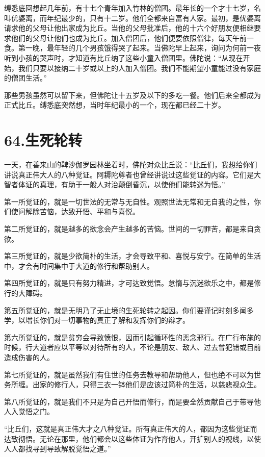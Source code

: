 \documentclass[12pt,twoside,openany]{book}
\begin{document}
缚悉底回想起几年前，有十七个青年加入竹林的僧团。最年长的一个才十七岁，名叫优婆离，而年纪最少的，只有十二岁。他们全都来自富有人家。最初，是优婆离请求他的父母让他出家成为比丘。当他的父母批准后，他的十六个好朋友便相继要求他们的父母让他们也成为比丘。加入僧团后，他们便要依照僧律，每天午前一食。第一晚，最年轻的几个男孩饿得哭了起来。当佛陀早上起来，询问为何前一夜听到小孩的哭声时，才知道有比丘纳了这些小童入僧团里。佛陀说：“从现在开始，我们只要以接纳二十岁或以上的人加入僧团。我们不能期望小童能过没有家庭的僧团生活。”

那些男孩虽然可以留下来，但佛陀让十五岁及以下的多吃一餐。他们后来全都成为正式比丘。缚悉底突然想，当时年纪最小的一个，现在都已经二十岁。


\chapter{64.生死轮转}\label{ch64}

一天，在善来山的鞞沙伽罗园林坐着时，佛陀对众比丘说：“比丘们，我想给你们讲说真正伟大人的八种觉证。阿耨陀尊者也曾经讲说过这些觉证的内容。它们是大智者体证的真理，有助于一般人对治颠倒昏沉，以使他们能转迷为悟。”

第一所觉证的，就是一切世法的无常与无自性。观照世法无常和无自我的之性，你们使问解除苦恼，达致开悟、平和与喜悦。

第二所觉证的，就是越多的欲念会产生越多的苦恼。世间的一切罪苦，都是来自贪欲。

第三所觉证的，就是少欲简朴的生活，才会导致平和、喜悦与安宁。在简单的生活中，才会有时间集中于大道的修行和帮助别人。

第四所觉证的，就是只有努力精进，才可达致觉悟。怠惰与沉迷欲乐之中，都是修行的大障碍。

第五所觉证的，就是无明乃了无止境的生死轮转之起因。你们要谨记时刻多闻多学，以增长你们对一切事物的真正了解和发挥你们的辩才。

第六所觉证的，就是贫穷会导致愤恨，因而引起循环性的恶念邪行。在广行布施的时候，行大道者应以平等以对待所有的人，不论是朋友、敌人、过去曾犯错或目前造成伤害的人。

第七所觉证的，就是虽然我们有住世的任务去教导和帮助他人，但也绝不可以为世务所缠。出家的修行人，只得三衣一钵他们是应该过简朴的生活，以慈悲视众生。

第八所觉证的，就是我们不只是为自己开悟而修行，而是要全然贡献自己于带导他人入觉悟之门。

“比丘们，这就是真正伟大才之八种觉证。所有真正伟大的人，都因为这些觉证而达致彻悟。无论在那里，他们都会以这些体证为作育他人，开扩别人的视线，以使人人都找寻到导致解脱觉悟之道。”
\end{document}
